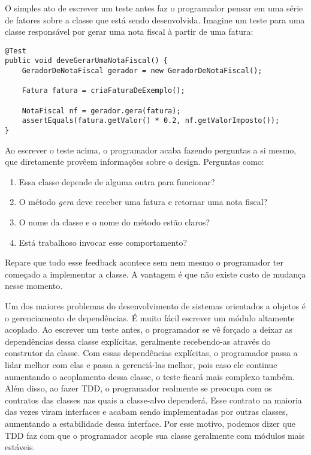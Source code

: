 O simples ato de escrever um teste antes faz o programador pensar em uma série de fatores 
sobre a classe que está sendo desenvolvida. Imagine um teste para uma 
classe responsável por gerar uma nota fiscal à partir de uma fatura:

\begin{lstlisting}[frame=trbl]
@Test
public void deveGerarUmaNotaFiscal() {
	GeradorDeNotaFiscal gerador = new GeradorDeNotaFiscal();
	
	Fatura fatura = criaFaturaDeExemplo();
	
	NotaFiscal nf = gerador.gera(fatura);
	assertEquals(fatura.getValor() * 0.2, nf.getValorImposto());
}
\end{lstlisting}

Ao escrever o teste acima, o programador acaba fazendo perguntas a si mesmo, que diretamente provêem informações sobre o design. Perguntas como:

\begin{enumerate}
	\item Essa classe depende de alguma outra para funcionar?
	\item O método \textit{gera} deve receber uma fatura e retornar uma nota fiscal?
	\item O nome da classe e o nome do método estão claros?
	\item Está trabalhoso invocar esse comportamento?
\end{enumerate}

Repare que todo esse feedback acontece sem nem mesmo o programador ter começado a implementar a classe. A vantagem é que
não existe custo de mudança nesse momento.

Um dos maiores problemas do desenvolvimento de sistemas orientados a objetos é o gerenciamento de dependências. É muito fácil
escrever um módulo altamente acoplado.
Ao escrever um teste antes, o programador se vê forçado a deixar as dependências dessa classe explícitas, 
geralmente recebendo-as através do construtor da classe. Com essas dependências explícitas, o programador passa a lidar 
melhor com elas e passa a gerenciá-las melhor, pois caso ele continue aumentando o acoplamento dessa classe, o teste ficará
mais complexo também. Além disso, ao fazer TDD, o programador realmente se preocupa com os contratos das classes nas quais
a classe-alvo dependerá. Esse contrato na maioria das vezes viram interfaces e acabam sendo implementadas por outras classes,
aumentando a estabilidade dessa interface. Por esse motivo, podemos dizer que TDD faz com que o programador acople sua classe
geralmente com módulos mais estáveis. 

